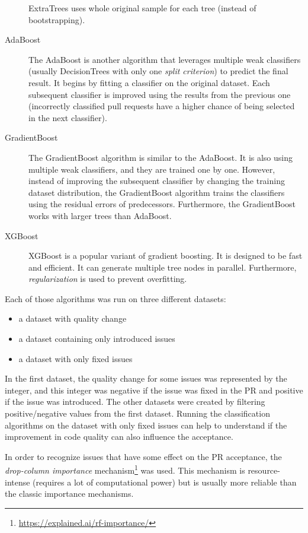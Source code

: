 \documentclass[digital,oneside,oldtable,nolof,nolot,nocover]{fithesis4}
\begin{document}
\begin{description}
ExtraTrees uses whole original sample for each tree (instead of
bootstrapping).
\item[{AdaBoost~\cite{adaboost}}] The AdaBoost is another algorithm that leverages multiple weak classifiers
(usually DecisionTrees with only one \emph{split criterion}) to predict the final result. It begins by fitting a
classifier on the original dataset. Each subsequent classifier is
improved using the results from the previous one (incorrectly classified
pull requests have a higher chance of being selected in the next
classifier).
\item[{GradientBoost~\cite{gradient}}] The GradientBoost algorithm is similar to the AdaBoost. It is also
using multiple weak classifiers, and they are trained one by one. However,
instead of improving the
subsequent classifier by changing the training dataset distribution, the GradientBoost algorithm
trains the classifiers using the residual errors of predecessors. Furthermore, the GradientBoost
works with larger trees than AdaBoost.
\item[{XGBoost~\cite{xgboost}}] XGBoost is a popular variant of gradient boosting. It is designed to be fast
and efficient. It can generate multiple tree nodes in parallel. Furthermore, \emph{regularization} is used
to prevent overfitting.
\end{description}
Each of those algorithms was run on three different datasets:
\begin{itemize}
\item a dataset with quality change
\item a dataset containing only introduced issues
\item a dataset with only fixed issues
\end{itemize}
In the first dataset, the quality change for some issues was
represented by the integer, and this integer was negative if the issue was fixed in the PR
and positive if the issue was introduced. The other datasets were created by filtering
positive/negative values from the first dataset. Running the classification algorithms on
the dataset with only fixed issues can help to understand if the improvement in code quality
can also influence the acceptance.

In order to recognize issues that have some effect on the PR acceptance,
the \emph{drop-column importance} mechanism\footnote{\url{https://explained.ai/rf-importance/}} was used.
This mechanism is resource-intense (requires a lot of computational power) but is usually more reliable
than the classic importance mechanisms.
\end{document}
